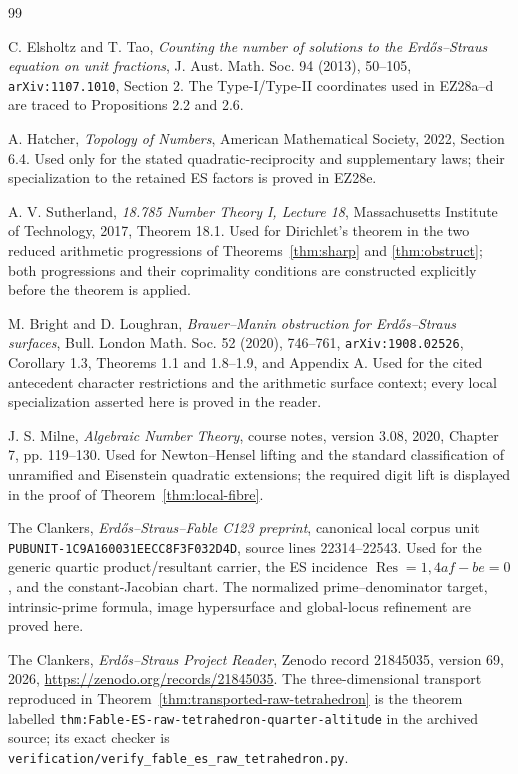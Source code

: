 \documentclass[11pt]{article}
\theoremstyle{definition}\newtheorem{definition}[theorem]{Definition}
\theoremstyle{remark}\newtheorem{remark}[theorem]{Remark}
\newcommand{\Res}{\operatorname{Res}}
\begin{document}
\begin{thebibliography}{99}
\small\raggedright

C. Elsholtz and T. Tao,
\emph{Counting the number of solutions to the Erd\H{o}s--Straus equation on
unit fractions},
J. Aust. Math. Soc. 94 (2013), 50--105,
\texttt{arXiv:1107.1010}, Section 2.
The Type-I/Type-II coordinates used in EZ28a--d are traced to Propositions
2.2 and 2.6.

A. Hatcher,
\emph{Topology of Numbers},
American Mathematical Society, 2022, Section 6.4.
Used only for the stated quadratic-reciprocity and supplementary laws; their
specialization to the retained ES factors is proved in EZ28e.

A. V. Sutherland,
\emph{18.785 Number Theory I, Lecture 18},
Massachusetts Institute of Technology, 2017, Theorem 18.1.
Used for Dirichlet's theorem in the two reduced arithmetic progressions of
Theorems~\ref{thm:sharp} and \ref{thm:obstruct}; both progressions and their
coprimality conditions are constructed explicitly before the theorem is
applied.

M. Bright and D. Loughran,
\emph{Brauer--Manin obstruction for Erd\H{o}s--Straus surfaces},
Bull. London Math. Soc. 52 (2020), 746--761,
\texttt{arXiv:1908.02526}, Corollary 1.3, Theorems 1.1 and 1.8--1.9,
and Appendix A.
Used for the cited antecedent character restrictions and the arithmetic
surface context; every local specialization asserted here is proved in the
reader.

J. S. Milne,
\emph{Algebraic Number Theory},
course notes, version 3.08, 2020, Chapter 7, pp. 119--130.
Used for Newton--Hensel lifting and the standard classification of unramified
and Eisenstein quadratic extensions; the required digit lift is displayed in
the proof of Theorem~\ref{thm:local-fibre}.

The Clankers,
\emph{Erd\H{o}s--Straus--Fable C123 preprint},
canonical local corpus unit \texttt{PUBUNIT-1C9A160031EECC8F3F032D4D},
source lines 22314--22543.
Used for the generic quartic product/resultant carrier, the ES incidence
\(\Res=1,4af-be=0\), and the constant-Jacobian chart.  The normalized
prime--denominator target, intrinsic-prime formula, image hypersurface and
global-locus refinement are proved here.

The Clankers,
\emph{Erd\H{o}s--Straus Project Reader},
Zenodo record 21845035, version 69, 2026,
\url{https://zenodo.org/records/21845035}.
The three-dimensional transport reproduced in
Theorem~\ref{thm:transported-raw-tetrahedron} is the theorem labelled
\texttt{thm:Fable-ES-raw-tetrahedron-quarter-altitude} in the archived
source; its exact checker is
\texttt{verification/verify\_fable\_es\_raw\_tetrahedron.py}.


\end{thebibliography}
\end{document}
